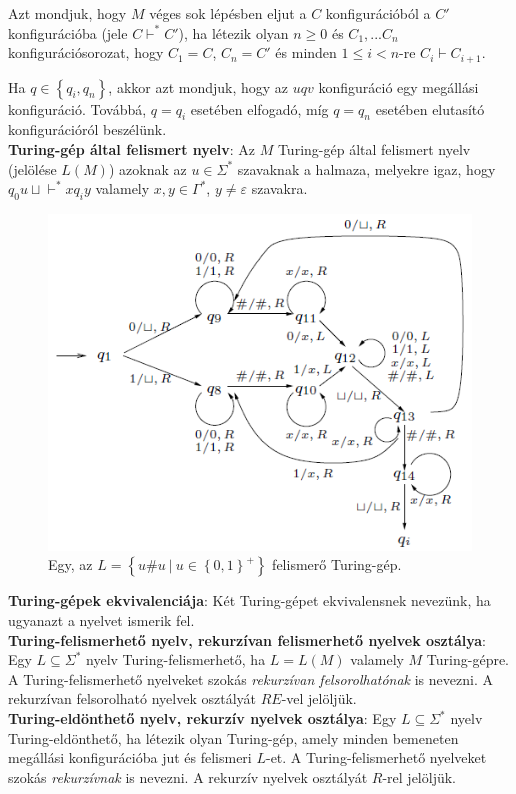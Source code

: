 \documentclass[margin=0px]{article}
\begin{document}
	Azt mondjuk, hogy $M$ véges sok lépésben eljut a $C$ konfigurációból a  $C'$ konfigurációba (jele $C \vdash^{*} C'$),
	ha létezik olyan $n \geq 0$ és $C_{1}, ... C_{n}$ konfigurációsorozat, hogy $C_{1} = C$, $C_{n} = C'$ és minden
	$1 \leq i < n$-re $C_{i} \vdash C_{i+1}$.
	
	Ha $q \in \left\{q_{i}, q_{n}\right\}$, akkor azt mondjuk, hogy az $uqv$ konfiguráció egy megállási
	konfiguráció. Továbbá, $q = q_{i}$ esetében elfogadó, míg $q = q_{n}$ esetében elutasító
	konfigurációról beszélünk.\\
	
	\noindent \textbf{Turing-gép által felismert nyelv}: Az $M$ Turing-gép által felismert nyelv (jelölése $L(M)$)
	azoknak az $u \in \Sigma^{*}$ szavaknak a halmaza, melyekre igaz, hogy $q_{0}u\sqcup \vdash^{*} xq_{i}y$
	valamely $x,y \in \Gamma^{*}$, $y \not = \varepsilon$ szavakra.
	
	\begin{figure}[H]
		\centering
		\includegraphics[width=0.6\linewidth]{img/turinggep_pelda}
		\caption{Egy, az $L = \left\{u\#u \ | \ u \in \left\{0,1\right\}^{+}\right\}$ felismerő Turing-gép.}
		\label{fig:turinggep_pelda}
	\end{figure}
	
	\noindent \textbf{Turing-gépek ekvivalenciája}: Két Turing-gépet ekvivalensnek nevezünk, ha ugyanazt a nyelvet ismerik fel.\\

	\noindent \textbf{Turing-felismerhető nyelv, rekurzívan felismerhető nyelvek osztálya}:
	Egy $L \subseteq \Sigma^{*}$ nyelv Turing-felismerhető, ha	$L = L(M)$ valamely $M$ Turing-gépre.
	A Turing-felismerhető nyelveket szokás \textit{rekurzívan felsorolhatónak} is nevezni.
	A rekurzívan felsorolható nyelvek osztályát $RE$-vel jelöljük.\\
	
	\noindent \textbf{Turing-eldönthető nyelv, rekurzív nyelvek osztálya}:
	Egy $L \subseteq \Sigma^{*}$ nyelv Turing-eldönthető, ha létezik olyan Turing-gép,
	amely minden bemeneten megállási konfigurációba jut és felismeri $L$-et.
	A Turing-felismerhető nyelveket szokás \textit{rekurzívnak} is nevezni.
	A rekurzív nyelvek osztályát $R$-rel jelöljük.\\
	
\end{document}
